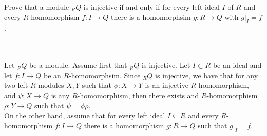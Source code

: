 Prove that a module $_RQ$ is injective if and only if for every left ideal $I$ of $R$ and every
$R$-homomorphism $f:I\to Q$ there is a homomorphsim $g:R\to Q$ with $g|_I=f$.\\\\

\begin{solution}\renewcommand{\qedsymbol}{}\ \\
    Let $_RQ$ be a module. Assume first that $_RQ$ is injective. Let $I\subset R$ be an ideal and let
    $f:I\to Q$ be an $R$-homomorphsim. Since $_RQ$ is injective, we have that for any two left
    $R$-modules $X,Y$ such that $\phi:X\to Y$ is an injective $R$-homomorphism, and $\psi:X\to Q$ is
    any $R$-homomorphism, then there exists and $R$-homomorphism $\rho:Y\to Q$ such that
    $\psi=\phi\rho$.\\

    On the other hand, assume that for every left ideal $I\subseteq R$ and every $R$-homomorphism
    $f:I\to Q$ there is a homomorphism $g:R\to Q$ such that $g|_I=f$.
\end{solution}